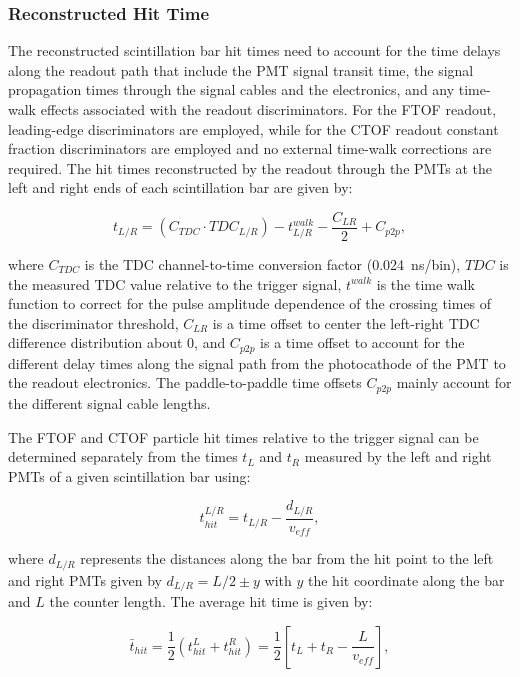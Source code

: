 \documentclass{elsart}
\begin{document}
\subsubsection{Reconstructed Hit Time}
\label{rec:time}

The reconstructed scintillation bar hit times need to account for the time delays along the readout path that
include the PMT signal transit time, the signal propagation times through the signal cables and the electronics, 
and any time-walk effects associated with the readout discriminators. For the FTOF readout, leading-edge
discriminators are employed, while for the CTOF readout constant fraction discriminators are employed and no
external time-walk corrections are required. The hit times reconstructed by the readout through the PMTs at
the left and right ends of each scintillation bar are given by:

\begin{equation}
t_{L/R} = (C_{TDC} \cdot TDC_{L/R}) - t_{L/R}^{walk} - \frac{C_{LR}}{2} + C_{p2p},
\end{equation}

\noindent
where $C_{TDC}$ is the TDC channel-to-time conversion factor (0.024~ns/bin), $TDC$ is the measured TDC value
relative to the trigger signal, $t^{walk}$ is the time walk function to correct for the pulse amplitude dependence of
the crossing times of the discriminator threshold, $C_{LR}$ is a time offset to center the left-right TDC difference
distribution about 0, and $C_{p2p}$ is a time offset to account for the different delay times along the signal path from
the photocathode of the PMT to the readout electronics. The paddle-to-paddle time offsets $C_{p2p}$ mainly account
for the different signal cable lengths.

The FTOF and CTOF particle hit times relative to the trigger signal can be determined separately from the times
$t_L$ and $t_R$ measured by the left and right PMTs of a given scintillation bar using:

\begin{equation}
t_{hit}^{L/R} = t_{L/R} - \frac{d_{L/R}}{v_{eff}},
\end{equation}

\noindent
where $d_{L/R}$ represents the distances along the bar from the hit point to the left and right PMTs given by
$d_{L/R}= L/2 \pm y$ with $y$ the hit coordinate along the bar and $L$ the counter length. The average hit time
is given by:

\begin{equation}
\bar{t}_{hit} = \frac{1}{2} ( t_{hit}^L + t_{hit}^R ) = \frac{1}{2} \left[ t_L + t_R - \frac{L}{v_{eff}} \right],
\end{equation}
\end{document}
